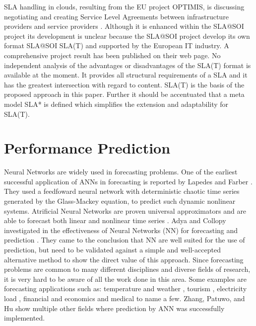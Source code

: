 SLA handling in clouds, resulting from the EU project OPTIMIS, is discussing negotiating and creating Service Level Agreements between infrastructure providers and service providers \cite{Lawrence:2010:USL:2050107.2050112}.
Although it is enhanced within the SLA@SOI project \cite{slasoi2011} its development is unclear because the SLA@SOI project develop its own format SLA@SOI SLA(T) \cite{slasoiwiki} and supported by the European IT industry. A comprehensive project result has been published on their web page. No independent analysis of the advantages or disadvantages of the SLA(T) format is available at the moment. It provides all structural requirements of a SLA and it has the greatest intersection with regard to content. SLA(T) is the basis of the proposed approach in this paper. Further it should be accentuated that a meta model SLA* \cite{slasoisrc} is defined which simplifies the extension and adaptability for SLA(T).

\section{Performance Prediction}
Neural Networks are widely used in forecasting problems. One of the earliest successful application of ANNs in forecasting is reported by Lapedes and Farber \cite{LapedesFarber87}. They used a feedfoward neural network with deterministic chaotic time series generated by the Glass-Mackey equation, to predict such dynamic nonlinear systems.
Atrificial Neural Networks are proven universal approximators \cite{Hornik1989359}\cite{Hornik1991251} and are able to forecast both linear \cite{Zhang20011183} and nonlinear time series \cite{Zhang199835}. Adya and Collopy investigated in the effectiveness of Neural Networks (NN) for forecasting and prediction \cite{neural1}. They came to the conclusion that NN are well suited for the use of prediction, but need to be validated against a simple and well-accepted alternative method to show the direct value of this approach. Since forecasting problems are common to many different disciplines and diverse fields of research, it is very hard to be aware of all the work done in this area.  Some examples are forecasting applications such as: temperature and weather \cite{Langella2010328}\cite{Buizza}\cite{Roebber}, tourism \cite{Pattie1996151}, electricity load \cite{Park76685}\cite{Hippert910780}, financial and economics \cite{Bodyanskiy20061357}\cite{McAdam2005848}\cite{Kaastra1996215}\cite{Guresen201110389} and medical \cite{Vukicevic2014}\cite{Arizmendi20145296} to name a few. Zhang, Patuwo, and Hu \cite{Zhang199835} show multiple other fields where prediction by ANN was successfully implemented.

